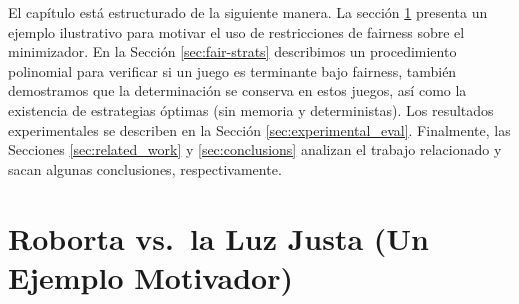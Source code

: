 El capítulo está estructurado de la siguiente manera. La sección \ref{sec:mot_example} presenta un ejemplo ilustrativo para motivar el uso de restricciones de fairness sobre el minimizador.
En la Sección \ref{sec:fair-strats} describimos un procedimiento polinomial para verificar si un juego es terminante bajo fairness,
también demostramos que la determinación se conserva en estos juegos, así como la existencia de estrategias óptimas (sin memoria y deterministas).
Los resultados experimentales se describen en la Sección \ref{sec:experimental_eval}.
Finalmente, las Secciones \ref{sec:related_work} y \ref{sec:conclusions} analizan el trabajo relacionado y sacan algunas conclusiones, respectivamente.




\newcommand{\roborta}{Roborta\xspace}

\section{\roborta vs.\ la Luz Justa (Un Ejemplo Motivador)} \label{sec:mot_example}

